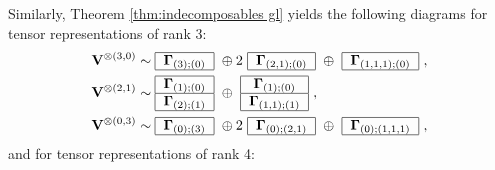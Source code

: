 \documentclass[12pt,reqno]{amsart}
\numberwithin{equation}{section}
\theoremstyle{plain}
\theoremstyle{definition}
\def\o{\otimes}
\def\glV_#1{\boldsymbol\Gamma_{#1}}
\def\VV{\mathbf V}
\begin{document}
\medskip

\noindent Similarly, Theorem \ref{thm:indecomposables gl} yields the
following diagrams for tensor representations of rank 3:
\begin{align*}
    \VV^{\o(3,0)} &\sim
    \begin{tabular}{|c|}
        \hline
        $\glV_{(3);(0)}$\\
        \hline
    \end{tabular}
    \ \oplus 2\
    \begin{tabular}{|c|}
        \hline
        $\glV_{(2,1);(0)}$\\
        \hline
    \end{tabular}
    \ \oplus \
    \begin{tabular}{|c|}
        \hline
        $\glV_{(1,1,1);(0)}$\\
        \hline
    \end{tabular}\ ,
\\
    \VV^{\o(2,1)} & \sim
    \begin{tabular}{|c|}
        \hline
        $\glV_{(1);(0)}$\\
        \hline
        $\glV_{(2);(1)}$\\
        \hline
    \end{tabular}
    \ \oplus \
    \begin{tabular}{|c|}
        \hline
        $\glV_{(1);(0)}$\\
        \hline
        $\glV_{(1,1);(1)}$\\
        \hline
    \end{tabular}\ ,
\\
    \VV^{\o(0,3)} &\sim
    \begin{tabular}{|c|}
        \hline
        $\glV_{(0);(3)}$\\
        \hline
    \end{tabular}
    \ \oplus 2\
    \begin{tabular}{|c|}
        \hline
        $\glV_{(0);(2,1)}$\\
        \hline
    \end{tabular}
    \ \oplus \
    \begin{tabular}{|c|}
        \hline
        $\glV_{(0);(1,1,1)}$\\
        \hline
    \end{tabular} \ ,
\end{align*}
and for tensor representations of rank 4:
\end{document}
